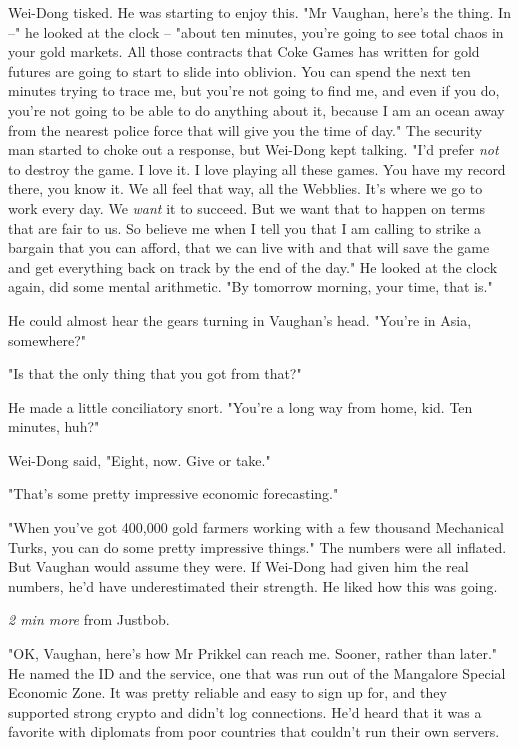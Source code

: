 Wei-Dong tisked. He was starting to enjoy this. "Mr Vaughan, here's
the thing. In --" he looked at the clock -- "about ten minutes,
you're going to see total chaos in your gold markets. All those
contracts that Coke Games has written for gold futures are going to
start to slide into oblivion. You can spend the next ten minutes
trying to trace me, but you're not going to find me, and even if
you do, you're not going to be able to do anything about it,
because I am an ocean away from the nearest police force that will
give you the time of day." The security man started to choke out a
response, but Wei-Dong kept talking. "I'd prefer \emph{not} to
destroy the game. I love it. I love playing all these games. You
have my record there, you know it. We all feel that way, all the
Webblies. It's where we go to work every day. We \emph{want} it to
succeed. But we want that to happen on terms that are fair to us.
So believe me when I tell you that I am calling to strike a bargain
that you can afford, that we can live with and that will save the
game and get everything back on track by the end of the day." He
looked at the clock again, did some mental arithmetic. "By tomorrow
morning, your time, that is."

He could almost hear the gears turning in Vaughan's head. "You're
in Asia, somewhere?"

"Is that the only thing that you got from that?"

He made a little conciliatory snort. "You're a long way from home,
kid. Ten minutes, huh?"

Wei-Dong said, "Eight, now. Give or take."

"That's some pretty impressive economic forecasting."

"When you've got 400,000 gold farmers working with a few thousand
Mechanical Turks, you can do some pretty impressive things." The
numbers were all inflated. But Vaughan would assume they were. If
Wei-Dong had given him the real numbers, he'd have underestimated
their strength. He liked how this was going.

\emph{2 min more} from Justbob.

"OK, Vaughan, here's how Mr Prikkel can reach me. Sooner, rather
than later." He named the ID and the service, one that was run out
of the Mangalore Special Economic Zone. It was pretty reliable and
easy to sign up for, and they supported strong crypto and didn't
log connections. He'd heard that it was a favorite with diplomats
from poor countries that couldn't run their own servers.

